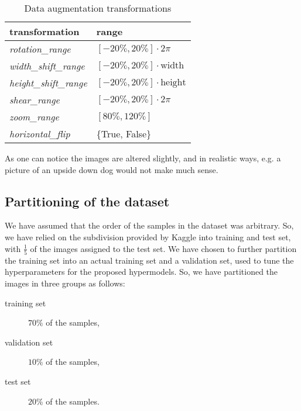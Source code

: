 \begin{table}[h]
    \centering
    \caption{Data augmentation transformations}
    \label{tab:dataAugmentation}
    \begin{tabular}{ll}
        \textbf{transformation} & \textbf{range} \\
        \midrule
        \textsl{rotation\_range} & $\left[-20\% , 20\%\right]\cdot 2\pi$ \\
        \textsl{width\_shift\_range} & $\left[-20\%, 20\% \right]\cdot \text{width}$ \\
        \textsl{height\_shift\_range} & $\left[-20\%, 20\%\right]\cdot \text{height}$ \\
        \textsl{shear\_range} & $\left[-20\% , 20\%\right]\cdot 2\pi$ \\
        \textsl{zoom\_range} & $\left[80\%, 120\%\right]$ \\
        \textsl{horizontal\_flip} & \{True, False\} \\
    \end{tabular}
\end{table}

As one can notice the images are altered slightly, and in realistic ways, e.g. a picture of an upside down dog would not make much sense.

\subsection{Partitioning of the dataset}
We have assumed that the order of the samples in the dataset was arbitrary. So, we have relied on the subdivision provided by Kaggle into training and test set, with $\frac{1}{5}$ of the images assigned to the test set. We have chosen to further partition the training set into an actual training set and a validation set, used to tune the hyperparameters for the proposed hypermodels. So, we have partitioned the images in three groups as follows:
\begin{description}
    \item[training set] $70\%$ of the samples,
    \item[validation set] $10\%$ of the samples,  
    \item[test set] $20\%$ of the samples. 
\end{description}